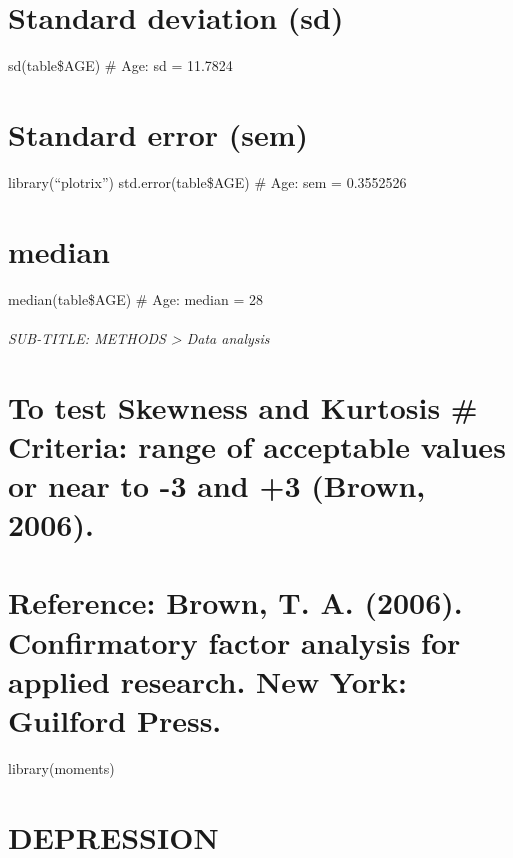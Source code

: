 \documentclass[
]{book}
\begin{document}
\hypertarget{standard-deviation-sd}{%
\chapter{Standard deviation (sd)}\label{standard-deviation-sd}}

sd(table\$AGE)
\# Age: sd = 11.7824

\hypertarget{standard-error-sem}{%
\chapter{Standard error (sem)}\label{standard-error-sem}}

library(``plotrix'')
std.error(table\$AGE)
\# Age: sem = 0.3552526

\hypertarget{median}{%
\chapter{median}\label{median}}

median(table\$AGE)
\# Age: median = 28

\hypertarget{sub-title-methods-data-analysis}{%
\subparagraph{SUB-TITLE: METHODS \textgreater{} Data analysis}\label{sub-title-methods-data-analysis}}

\hypertarget{to-test-skewness-and-kurtosis-criteria-range-of-acceptable-values-or-near-to--3-and-3-brown-2006.}{%
\chapter{To test Skewness and Kurtosis \# Criteria: range of acceptable values or near to -3 and +3 (Brown, 2006).}\label{to-test-skewness-and-kurtosis-criteria-range-of-acceptable-values-or-near-to--3-and-3-brown-2006.}}

\hypertarget{reference-brown-t.-a.-2006.-confirmatory-factor-analysis-for-applied-research.-new-york-guilford-press.}{%
\chapter{Reference: Brown, T. A. (2006). Confirmatory factor analysis for applied research. New York: Guilford Press.}\label{reference-brown-t.-a.-2006.-confirmatory-factor-analysis-for-applied-research.-new-york-guilford-press.}}

library(moments)

\hypertarget{depression}{%
\chapter{DEPRESSION}\label{depression}}
\end{document}

